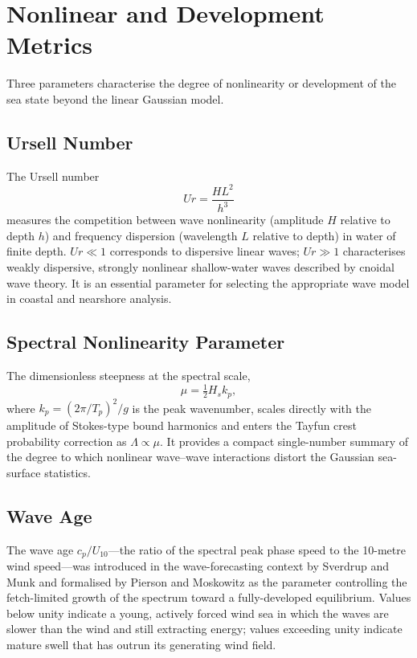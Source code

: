 \documentclass[journal]{IEEEtran}
\begin{document}
    \section{Nonlinear and Development Metrics}
    \label{sec:nonlinear}

    Three parameters characterise the degree of nonlinearity or development
    of the sea state beyond the linear Gaussian model.

    \subsection{Ursell Number}

    The Ursell number \cite{Ursell1953}
    \begin{equation}
        Ur = \frac{H L^2}{h^3}
    \end{equation}
    measures the competition between wave nonlinearity (amplitude $H$ relative
    to depth $h$) and frequency dispersion (wavelength $L$ relative to depth)
    in water of finite depth.
    $Ur \ll 1$ corresponds to dispersive linear waves; $Ur \gg 1$
    characterises weakly dispersive, strongly nonlinear shallow-water waves
    described by cnoidal wave theory.
    It is an essential parameter for selecting the appropriate wave model in
    coastal and nearshore analysis.

    \subsection{Spectral Nonlinearity Parameter}

    The dimensionless steepness at the spectral scale,
    \begin{equation}
        \mu = \tfrac{1}{2}H_s k_p,
    \end{equation}
    where $k_p = (2\pi/T_p)^2/g$ is the peak wavenumber, scales directly
    with the amplitude of Stokes-type bound harmonics and enters the
    Tayfun crest probability correction as $\Lambda \propto \mu$.
    It provides a compact single-number summary of the degree to which
    nonlinear wave--wave interactions distort the Gaussian sea-surface
    statistics.

    \subsection{Wave Age}

    The wave age $c_p/U_{10}$---the ratio of the spectral peak phase speed
    to the 10-metre wind speed---was introduced in the wave-forecasting
    context by Sverdrup and Munk \cite{Sverdrup1947} and formalised by
    Pierson and Moskowitz \cite{PiersonMoskowitz1964} as the parameter
    controlling the fetch-limited growth of the spectrum toward a
    fully-developed equilibrium.
    Values below unity indicate a young, actively forced wind sea in which
    the waves are slower than the wind and still extracting energy;
    values exceeding unity indicate mature swell that has outrun its
    generating wind field.
\end{document}
